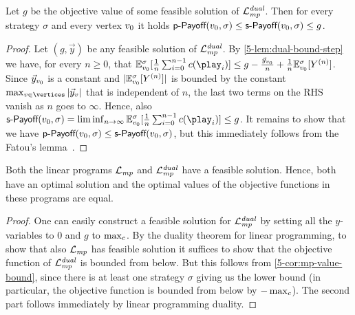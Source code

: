 \begin{corollary}
\label{5-cor:mp-value-bound}
Let $g$ be the objective value of some feasible solution of $\mathcal{L}_{\mathit{mp}}^{\mathit{dual}}$. Then for every strategy $\sigma$ and every vertex $v_0$ it holds $\textsf{p-Payoff}(v_0,\sigma) \leq \textsf{s-Payoff}(v_0,\sigma) \leq g$.
\end{corollary}
\begin{proof}
Let $ ({g}, \vec{y})$ be any feasible solution of $\mathcal{L}_{\mathit{mp}}^{\mathit{dual}}$.
By \cref{5-lem:dual-bound-step} we have, for every $n\geq 0$, that $\expv^\sigma_{\vinit}[\frac{1}{n}\sum_{i=0}^{n-1}\colouring(\play_i)]\leq g - \frac{ \vec{y}_{\vinit}}{n}+ \frac{1}{n}\expv^\sigma_{\vinit} [Y^{(n)}]$. Since $ \vec{y}_{v_0}$ is a constant and $|\mathbb{E}^\sigma_{v_0} [Y^{(n)}]|$ is bounded by the constant $ \max_{v\in \vertices}|\vec{y}_v|$ that is independent of $n$, the last two terms on the RHS vanish as $n$ goes to $\infty$. Hence, also $\stepPay(\vinit,\sigma) = \liminf_{n\rightarrow \infty} \expv^\sigma_{\vinit}[\frac{1}{n}\sum_{i=0}^{n-1}\colouring(\play_i)] \leq g$. It remains to show that we have $\textsf{p-Payoff}(v_0,\sigma) \leq \textsf{s-Payoff}(v_0,\sigma)$, but this immediately follows from the Fatou's lemma~\cite[Theorem 1.6.8]{Ash&Doleans-Dade:2000}.
\end{proof}

\begin{corollary}
\label{5-cor:lpmp-optimal-exists}
Both the linear programs $\mathcal{L}_{\mathit{mp}}$ and $\mathcal{L}_{\mathit{mp}}^{\mathit{dual}}$ have a feasible solution. Hence, both have an optimal solution and the optimal values of the objective functions in these programs are equal.
\end{corollary}
\begin{proof}
One can easily construct a feasible solution for $\mathcal{L}_{\mathit{mp}}^{\mathit{dual}}$ by setting all the $y$-variables to $0$ and $g$ to $\max_{c}$. By the duality theorem for linear programming, to show that also $\mathcal{L}_{\mathit{mp}}$ has feasible solution it suffices to show that the objective function of $\mathcal{L}_{\mathit{mp}}^{\mathit{dual}}$ is bounded from below. But this follows from \cref{5-cor:mp-value-bound}, since there is at least one strategy $\sigma$ giving us the lower bound (in particular, the objective function is bounded from below by $-\max_{c}$). The second part follows immediately by linear programming duality.
\end{proof}



